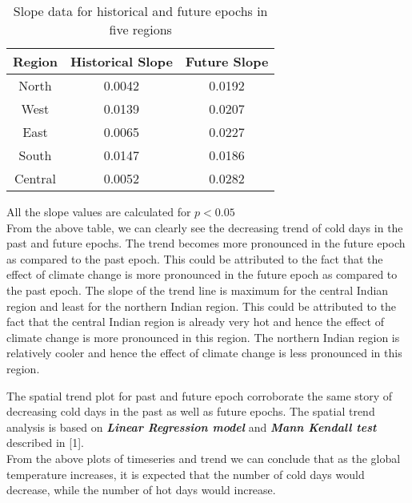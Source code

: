\documentclass[a4paper, 12pt, twoside]{report}
\begin{document}
\begin{table}[h]
    \centering
    \caption{Slope data for historical and future epochs in five regions}
    \label{tab:slope-data}
    \begin{tabular}{|c|c|c|}
        \hline
        Region  & \textbf{Historical Slope} & \textbf{Future Slope} \\ \hline
        North   & 0.0042                    & 0.0192                \\ \hline
        West    & 0.0139                    & 0.0207                \\ \hline
        East    & 0.0065                    & 0.0227                \\ \hline
        South   & 0.0147                    & 0.0186                \\ \hline
        Central & 0.0052                    & 0.0282                \\ \hline
    \end{tabular}
\end{table}

All the slope values are calculated for $p<0.05$ \\

From the above table, we can clearly see the decreasing trend of cold days in the past and future epochs. The trend becomes more pronounced in the future epoch as compared to the past epoch. This could be attributed to the fact that the effect of climate change is more pronounced in the future epoch as compared to the past epoch. The slope of the trend line is maximum for the central Indian region and least for the northern Indian region. This could be attributed to the fact that the central Indian region is already very hot and hence the effect of climate change is more pronounced in this region. The northern Indian region is relatively cooler and hence the effect of climate change is less pronounced in this region.

The spatial trend plot for past and future epoch corroborate the same story of decreasing cold days in the past as well as future epochs. The spatial trend analysis is based on \textbf{\textit{Linear Regression model}} and \textbf{\textit{Mann Kendall test}} described in [1]. \\

From the above plots of timeseries and trend we can conclude that as the global temperature increases, it is expected that the number of cold days would decrease, while the number of hot days would increase.
\end{document}
